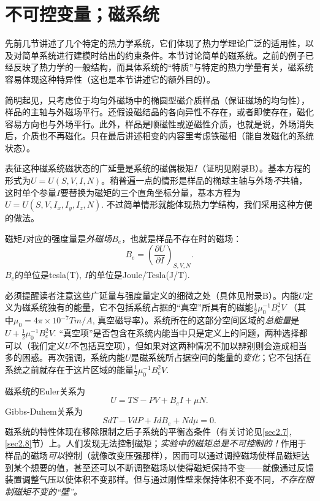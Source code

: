 \section{不可控变量；磁系统}
\label{sec3.8}
先前几节讲述了几个特定的热力学系统，它们体现了热力学理论广泛的适用性，以及对简单系统进行建模时给出的约束条件。本节讨论简单的磁系统。之前的例子已经反映了热力学的一般结构，而具体系统的“特质”与特定的热力学量有关，磁系统容易体现这种特异性（这也是本节讲述它的额外目的）。

简明起见，只考虑位于均匀外磁场中的椭圆型磁介质样品（保证磁场的均匀性），样品的主轴与外磁场平行。还假设磁结晶的各向异性不存在，或者即使存在，磁化容易方向也与外场平行。此外，样品是顺磁性或逆磁性介质，也就是说，外场消失后，介质也不再磁化。只在最后讲述相变的内容里考虑铁磁相（能自发磁化的系统状态）。

表征这种磁系统磁状态的广延量是系统的磁偶极矩$I$（证明见附录B）。基本方程的形式为$U = U(S, V, I, N)$。稍普遍一点的情形是样品的椭球主轴与外场{\it 不}共轴，这时单个参量$I$要替换为磁矩的三个直角坐标分量，基本方程为$U = U(S, V, I_x, I_y, I_z, N)$. 不过简单情形就能体现热力学结构，我们采用这种方便的做法。

磁矩$I$对应的强度量是{\it 外磁场}$B_e$，也就是样品不存在时的磁场：
\begin{equation}
    B_e = \left( \frac{\partial U}{\partial I} \right)_{S, V, N}.
\label{equ3.63}
\end{equation}
$B_e$的单位是tesla(T), $I$的单位是Joule/Tesla(J/T).

必须提醒读者注意这些广延量与强度量定义的细微之处（具体见附录B）。内能$U$定义为磁系统独有的能量，它不包括系统占据的“真空”所具有的磁能$\frac{1}{2} \mu_0^{-1} B_e^2 V$ （其中$\mu_0 = 4\pi \times 10^{-7} \si{T m / A}$, 真空磁导率）。系统所在的这部分空间区域的{\it 总能量}是$U + \frac{1}{2} \mu_0^{-1} B_e^2 V$. “真空项”是否包含在系统内能当中只是定义上的问题，两种选择都可以（我们定义$U$不包括真空项），但如果对这两种情况不加以辨别则会造成相当多的困惑。再次强调，系统内能$U$是磁系统所占据空间的能量的{\it 变化}；它不包括在系统之前就存在于这片区域的能量$\frac{1}{2} \mu_0^{-1} B_e^2 V$.

磁系统的Euler关系为
\begin{equation}
    U = TS - PV + B_e I + \mu N.
\label{equ3.64}
\end{equation}
Gibbs-Duhem关系为
\begin{equation}
    SdT - VdP + IdB_e + Nd\mu = 0.
\label{equ3.65}
\end{equation}
磁系统的特性体现在移除限制之后子系统的平衡态条件（有关讨论见\ref{sec2.7}, \ref{sec2.8}节）上。人们发现无法控制磁矩；{\it 实验中的磁矩总是不可控制的！}作用于样品的磁场{\it 可以}控制（就像改变压强那样），因而可以通过调控磁场使样品磁矩达到某个想要的值，甚至还可以不断调整磁场以使得磁矩保持不变——就像通过反馈装置调整气压以使体积不变那样。但与通过刚性壁来保持体积不变不同，{\it 不存在限制磁矩不变的“壁”。}


